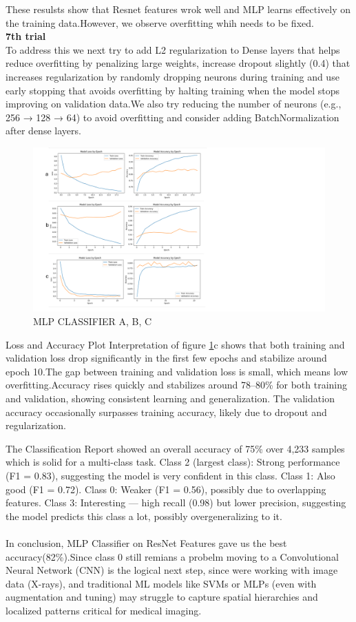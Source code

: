 \documentclass{article}
\begin{document}
These resulsts show that Resnet features wrok well and MLP learns effectively on the training data.However, we observe overfitting whih needs to be fixed.\\
\textbf{7th trial}\\
To address this we next try to add L2 regularization to Dense layers that helps reduce overfitting by penalizing large weights, increase dropout slightly (0.4) that increases regularization by randomly dropping neurons during training and use early stopping that avoids overfitting by halting training when the model stops improving on validation data.We also try reducing the number of neurons (e.g., 256 → 128 → 64) to avoid overfitting and consider adding BatchNormalization after dense layers.
\begin{figure}[ht] %
    \centering
    \includegraphics[width=1.0\linewidth]{comparemlp2.png}
    \caption{MLP CLASSIFIER A, B, C}
    \label{fig:MLP_CLASSIFIER_compare}
\end{figure}
Loss and Accuracy Plot Interpretation of figure \ref{fig:MLP_CLASSIFIER_compare}c shows that both training and validation loss drop significantly in the first few epochs and stabilize around epoch 10.The gap between training and validation loss is small, which means low overfitting.Accuracy rises quickly and stabilizes around 78–80\% for both training and validation, showing consistent learning and generalization.
The validation accuracy occasionally surpasses training accuracy, likely due to dropout and regularization.

The Classification Report showed an overall accuracy of 75\% over 4,233 samples which is solid for a multi-class task.
Class 2 (largest class): Strong performance (F1 = 0.83), suggesting the model is very confident in this class.
Class 1: Also good (F1 = 0.72).
Class 0: Weaker (F1 = 0.56), possibly due to overlapping features.
Class 3: Interesting — high recall (0.98) but lower precision, suggesting the model predicts this class a lot, possibly overgeneralizing to it.\\
\\
In conclusion, MLP Classifier on ResNet Features gave us the best accuracy(82\%).Since class 0 still remians a probelm moving to a Convolutional Neural Network (CNN) is the logical next step, since were working with image data (X-rays), and traditional ML models like SVMs or MLPs (even with augmentation and tuning) may struggle to capture spatial hierarchies and localized patterns critical for medical imaging.\\
\end{document}
